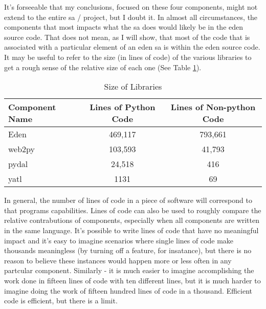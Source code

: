 \documentclass[a4paper,man,natbib,floatsintext]{apa6}
\begin{document}
  It's forseeable that my conclusions, focused on these four components, might not extend to the entire \gls{sa} / project, but I doubt it. In almost all circumstances, the components that most impacts what the \gls{sa} does would likely be in the \acrshort{eden} source code. That does not mean, as I will show, that most of the code that is associated with a particular element of an \acrshort{eden} \gls{sa} is within the \acrshort{eden} source code. It may be useful to refer to the size (in lines of code) of the various libraries to get a rough sense of the relative size of each one (See Table \ref{tab:table-2}). 

  \begin{table}[ht]
  \caption{Size of Libraries}
  \label{tab:table-2}
  \begin{tabular}{|l|c|c|}
  \hline
  Component Name & Lines of Python Code & Lines of Non-python Code \\ \hline
  Eden           & 469,117              & 793,661                  \\ \hline
  web2py         & 103,593              & 41,793                   \\ \hline
  pydal          & 24,518               & 416                      \\ \hline
  yatl           & 1131                 & 69                       \\ \hline
  \end{tabular}
\end{table}

  In general, the number of lines of code in a piece of software will correspond to that programs capabilities. Lines of code can also be used to roughly compare the relative contrabutions of components, especially when all components are written in the same language. It's possible to write lines of code that have no meaningful impact and it's easy to imagine scenarios where single lines of code make thousands meaningless (by turning off a feature, for insatance), but there is no reason to believe these instances would happen more or less often in any partcular component. Similarly -  it is much easier to imagine accomplishing the work done in fifteen lines of code with ten different lines, but it is much harder to imagine doing the work of fifteen hundred lines of code in a thousand. Efficient code is efficient, but there is a limit.
\end{document}
